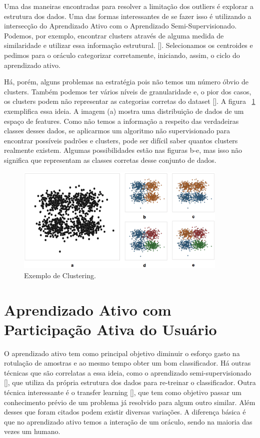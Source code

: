 Uma das maneiras encontradas para resolver a limitação dos outliers é explorar a estrutura dos dados. Uma das formas interessantes de se fazer isso é utilizando a intersecção do Aprendizado Ativo com o Aprendizado Semi-Supervisionado. Podemos, por exemplo, encontrar clusters através de alguma medida de similaridade e utilizar essa informação estrutural. [\cite{saito2014active, dasgupta2011two}]. Selecionamos os centroides e pedimos para o oráculo categorizar corretamente, iniciando, assim, o ciclo do aprendizado ativo. 

Há, porém, alguns problemas na estratégia pois não temos um número óbvio de clusters. Também podemos ter vários níveis de granularidade e, o pior dos casos, os clusters podem não representar as categorias corretas do dataset [\cite{dasgupta2011two, settles2014active}].  A figura ~\ref{fig:toy_example_clustering} exemplifica essa ideia. A imagem (a) mostra uma distribuição de dados de um espaço de features. Como não temos a informação a respeito das verdadeiras classes desses dados, se aplicarmos um algoritmo não supervisionado para encontrar possíveis padrões e clusters, pode ser difícil saber quantos clusters realmente existem. Algumas possibilidades estão nas figuras b-e, mas isso não significa que representam as classes corretas desse conjunto de dados. 


\begin{figure}
  \centering
  \includegraphics[width=0.9\textwidth]{figures/toy_example_clustering.png}
  \caption{Exemplo de Clustering.}
  \label{fig:toy_example_clustering}
\end{figure}


\section{Aprendizado Ativo com Participação Ativa do Usuário}
\label{sec:aprendizado_ativo_variacoes}

O aprendizado ativo tem como principal objetivo diminuir o esforço gasto na rotulação de amostras e ao mesmo tempo obter um bom classificador. Há outras técnicas que são correlatas a essa ideia, como o aprendizado semi-supervisionado [\cite{zhu2006semi}], que utiliza da própria estrutura dos dados para re-treinar o classificador. Outra técnica interessante é o transfer learning [\cite{rodrigues2018evaluation}], que tem como objetivo passar um conhecimento prévio de um problema já resolvido para algum outro similar. Além desses que foram citados podem existir diversas variações. A diferença básica é que no aprendizado ativo temos a interação de um oráculo, sendo na maioria das vezes um humano. 


